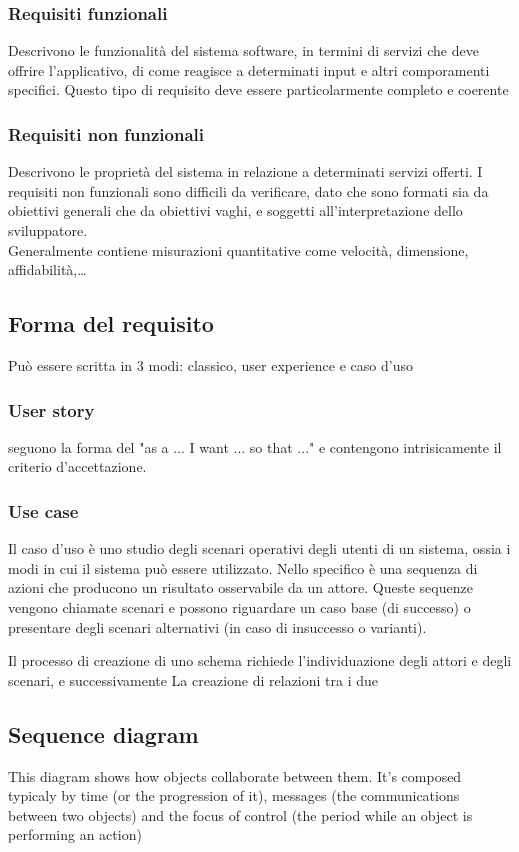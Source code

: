 \documentclass[12pt, a4paper]{article}
\begin{document}
\subsubsection*{Requisiti funzionali}
Descrivono le funzionalità del sistema software, in termini di servizi che deve offrire l'applicativo, di come reagisce 
a determinati input e altri comporamenti specifici. Questo tipo di requisito deve essere particolarmente completo e
coerente

\subsubsection*{Requisiti non funzionali}
Descrivono le proprietà del sistema in relazione a determinati servizi offerti. I requisiti non funzionali sono difficili 
da verificare, dato che sono formati sia da obiettivi generali che da obiettivi vaghi, e soggetti all'interpretazione 
dello sviluppatore.\\Generalmente contiene misurazioni quantitative come velocità, dimensione, affidabilità,\dots

\subsection{Forma del requisito}
Può essere scritta in 3 modi: classico, user experience e caso d'uso
\subsubsection*{User story}
seguono la forma del "as a ... I want ... so that ..." e contengono intrisicamente il criterio d'accettazione.
\subsubsection*{Use case}
Il caso d'uso è uno studio degli scenari operativi degli utenti di un sistema, ossia i modi in cui il sistema può essere 
utilizzato. Nello specifico è una sequenza di azioni che producono un risultato osservabile da un attore. Queste 
sequenze vengono chiamate scenari e possono riguardare un caso base (di successo) o presentare degli scenari alternativi
(in caso di insuccesso o varianti). 

Il processo di creazione di uno schema richiede l'individuazione degli attori e degli scenari, e successivamente La
creazione di relazioni tra i due

\subsection{Sequence diagram}
This diagram shows how objects collaborate between them. It's composed typicaly by time (or the progression of it), 
messages (the communications between two objects) and the focus of control (the period while an object is performing an
action)
\end{document}
